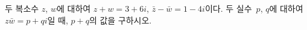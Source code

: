 두 복소수 $z$, $w$에 대하여 $z+w=3+6i$, $\bar{z}-\bar{w}=1-4i$이다. 두 실수~$p$, $q$에 대하여 $z\bar{w}=p+qi$일 때, $p+q$의 값을 구하시오. 

